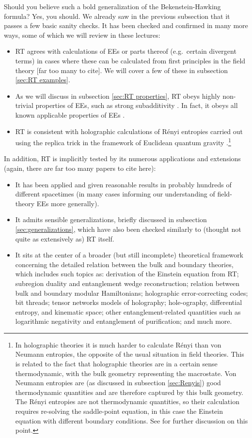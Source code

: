 \documentclass[11pt]{article}
\begin{document}
Should you believe such a bold generalization of the Bekenstein-Hawking formula? Yes, you should. We already saw in the previous subsection that it passes a few basic sanity checks. It has been checked and confirmed in many more ways, some of which we will review in these lectures:
\begin{itemize}
\item RT agrees with calculations of EEs or parts thereof (e.g.\ certain divergent terms) in cases where these can be calculated from first principles in the field theory [far too many to cite]. We will cover a few of these in subsection \ref{sec:RT examples}.
\item As we will discuss in subsection \ref{sec:RT properties}, RT obeys highly non-trivial properties of EEs, such as strong subadditivity \cite{Headrick:2007km,Headrick:2013zda}. In fact, it obeys all known applicable properties of EEs \cite{Hayden:2011ag}.
\item RT is consistent with holographic calculations of R\'enyi entropies carried out using the replica trick in the framework of Euclidean quantum gravity \cite{Headrick:2010zt,Faulkner:2013yia,Lewkowycz:2013nqa}.\footnote{In holographic theories it is much harder to calculate R\'enyi than von Neumann entropies, the opposite of the usual situation in field theories. This is related to the fact that holographic theories are in a certain sense thermodynamic, with the bulk geometry representing the macrostate. Von Neumann entropies are (as discussed in subsection \ref{sec:Renyis}) good thermodynamic quantities and are therefore captured by this bulk geometry. The R\'enyi entropies are not thermodynamic quantities, so their calculation requires re-solving the saddle-point equation, in this case the Einstein equation with different boundary conditions. See \cite{Headrick:2013zda} for further discussion on this point.}
\end{itemize}

In addition, RT is implicitly tested by its numerous applications and extensions (again, there are far too many papers to cite here):
\begin{itemize}
\item It has been applied and given reasonable results in probably hundreds of different spacetimes (in many cases informing our understanding of field-theory EEs more generally).
\item It admits sensible generalizations, briefly discussed in subsection \ref{sec:generalizations}, which have also been checked similarly to (thought not quite as extensively as) RT itself.
\item It sits at the center of a broader (but still incomplete) theoretical framework concerning the detailed relation between the bulk and boundary theories, which includes such topics as: derivation of the Einstein equation from RT; subregion duality and entanglement wedge reconstruction; relation between bulk and boundary modular Hamiltonians; holographic error-correcting codes; bit threads; tensor networks models of holography; hole-ography, differential entropy, and kinematic space; other entanglement-related quantities such as logarithmic negativity and entanglement of purification; and much more.
\end{itemize}
\end{document}

